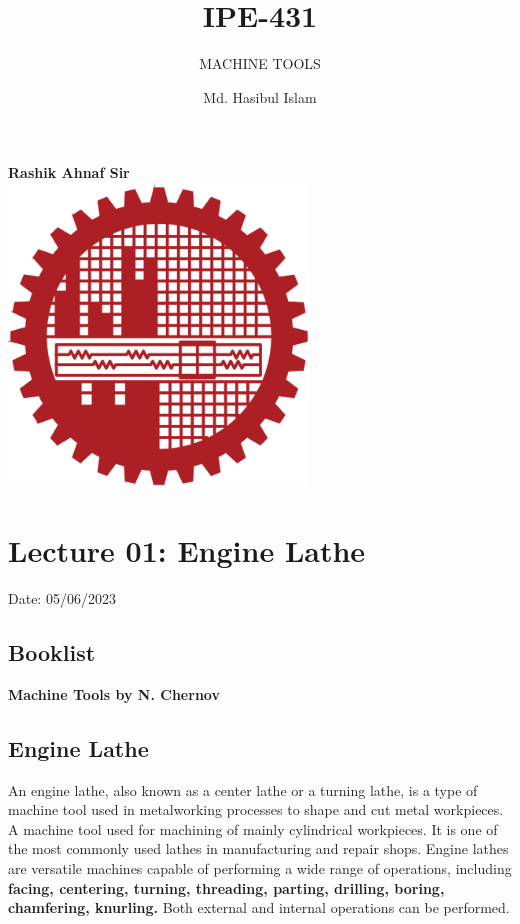 \documentclass{article}
\title{IPE-431}
\author{Md. Hasibul Islam}
\subtitle{MACHINE TOOLS}
\begin{document}
\begin{titlepage}
    \centering
    
    {\Huge\bfseries\maketitle}
    \textbf{Rashik Ahnaf Sir} \\
    \vspace{2cm}
    \includegraphics[width=8cm]{institution_logo.jpg}
    \vfill
    \vspace*{2cm}
\end{titlepage}

\tableofcontents
\pagebreak
\section{Lecture 01: Engine Lathe} 
\hfill Date: 05/06/2023

\subsection*{Booklist}

\textbf{Machine Tools by N. Chernov}


\subsection*{Engine Lathe}
An engine lathe, also known as a center lathe or a turning lathe, is a type of machine tool used in metalworking processes to shape and cut metal workpieces. A machine tool used for machining of mainly cylindrical workpieces. It is one of the most commonly used lathes in manufacturing and repair shops. Engine lathes are versatile machines capable of performing a wide range of operations, including \textbf{facing, centering, turning, threading, parting, drilling, boring, chamfering, knurling.}  Both external and internal operations can be performed.
\end{document}
